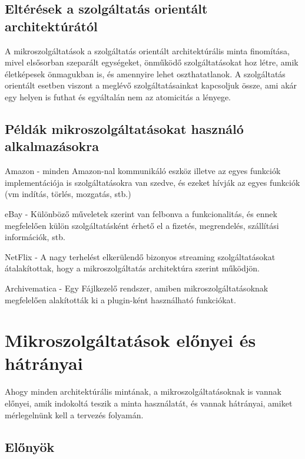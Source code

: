 \documentclass[11pt,magyar,a4paper,twoside,]{report}
\begin{document}
\subsection{Eltérések a szolgáltatás orientált
architektúrától}\label{eltuxe9ruxe9sek-a-szolguxe1ltatuxe1s-orientuxe1lt-architektuxfaruxe1tuxf3l}

A mikroszolgáltatások a szolgáltatás orientált architektúrális minta
finomítása, mivel elsősorban szeparált egységeket, önműködő
szolgáltatásokat hoz létre, amik életképesek önmagukban is, és amennyire
lehet oszthatatlanok. A szolgáltatás orientált esetben viszont a meglévő
szolgáltatásainkat kapcsoljuk össze, ami akár egy helyen is futhat és
egyáltalán nem az atomicitás a lényege.

\subsection{Példák mikroszolgáltatásokat használó
alkalmazásokra}\label{puxe9lduxe1k-mikroszolguxe1ltatuxe1sokat-hasznuxe1luxf3-alkalmazuxe1sokra}

Amazon - minden Amazon-nal kommunikáló eszköz illetve az egyes funkciók
implementációja is szolgáltatásokra van szedve, és ezeket hívják az
egyes funkciók (vm indítás, törlés, mozgatás, stb.)

eBay - Különböző műveletek szerint van felbonva a funkcionalitás, és
ennek megfelelően külön szolgáltatásként érhető el a fizetés,
megrendelés, szállítási információk, stb.

NetFlix - A nagy terhelést elkerülendő bizonyos streaming
szolgáltatásokat átalakítottak, hogy a mikroszolgáltatás architektúra
szerint működjön.

Archivematica\citep{archivematica} - Egy Fájlkezelő rendszer, amiben
mikroszolgáltatásoknak megfelelően alakították ki a plugin-ként
használható funkciókat.

\section{Mikroszolgáltatások előnyei és
hátrányai}\label{mikroszolguxe1ltatuxe1sok-elux151nyei-uxe9s-huxe1truxe1nyai}

Ahogy minden architektúrális mintának, a mikroszolgáltatásoknak is
vannak előnyei\citep{microservices}, amik indokoltá teszik a minta
használatát, és vannak hátrányai\citep{micro-disadv}, amiket
mérlegelnünk kell a tervezés folyamán.

\subsection{Előnyök}\label{elux151nyuxf6k}
\end{document}
